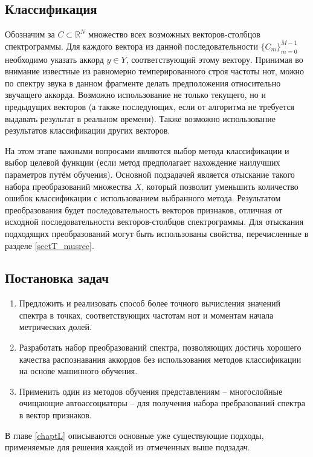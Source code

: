 \subsection{Классификация}

Обозначим за $C \subset \mathbb{R}^N$ множество всех возможных векторов-столбцов
спектрограммы. Для каждого вектора из данной последовательности
$\{C_m\}_{m=0}^{M-1}$ необходимо указать аккорд $y \in Y$, соответствующий
этому вектору. Принимая во внимание известные из равномерно темперированного
строя частоты нот, можно по спектру звука в данном фрагменте делать
предположения относительно звучащего аккорда. Возможно использование не только
текущего, но и предыдущих векторов (а также последующих, если от алгоритма не
требуется выдавать результат в реальном времени). Также возможно использование
результатов классификации других векторов.

На этом этапе важными вопросами являются выбор метода классификации и выбор
целевой функции (если метод предполагает нахождение наилучших параметров путём
обучения). Основной подзадачей является отыскание такого набора преобразований
множества $X$, который позволит уменьшить количество ошибок классификации с
использованием выбранного метода. Результатом преобразования будет
последовательность векторов признаков, отличная от исходной последовательности
векторов-столбцов спектрограммы. Для отыскания подходящих преобразований могут
быть использованы свойства, перечисленные в разделе \ref{sectT_musrec}.

\subsection{Постановка задач}

\begin{enumerate}
  \item Предложить и реализовать способ более точного вычисления значений
  спектра в точках, соответствующих частотам нот и моментам начала метрических
  долей.
  \item Разработать набор преобразований спектра, позволяющих достичь хорошего
  качества распознавания аккордов без использования методов классификации на
  основе машинного обучения.
  \item Применить один из методов обучения представлениям -- многослойные
  очищающие автоассоциаторы -- для получения набора пребразований спектра в
  вектор признаков.
\end{enumerate}

В главе \ref{chaptL} описываются основные уже существующие подходы, применяемые
для решения каждой из отмеченных выше подзадач.

\clearpage